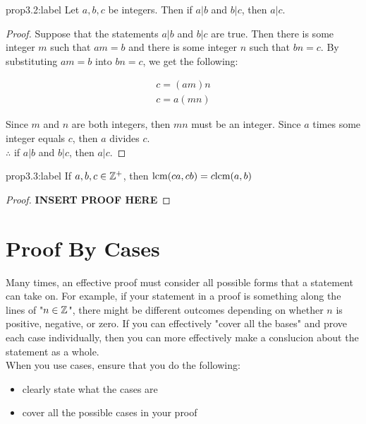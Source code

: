 \begin{proposition}{prop3.2:label}
    Let $a,b,c$ be integers. Then if $a|b$ and $b|c$, then $a|c$. 
\end{proposition}

\begin{proof}
    Suppose that the statements $a|b$ and $b|c$ are true. Then there is some integer $m$ such that $am = b$ and there is some integer $n$ such that $bn = c$. By substituting $am = b$ into $bn = c$, we get the following:

    $$
    \begin{aligned}
        c = (am)n\\
        c = a(mn)
    \end{aligned}
    $$

    Since $m$ and $n$ are both integers, then $mn$ must be an integer. Since $a$ times some integer equals $c$, then $a$ divides $c$.\\

    $\therefore$ if $a|b$ and $b|c$, then $a|c$.
\end{proof}

\begin{proposition}{prop3.3:label}
    If $a,b,c \in \mathbb{Z}^+$, then $\text{lcm}(ca,cb) = c\text{lcm}(a,b)$
\end{proposition}

\begin{proof}
    \textbf{INSERT PROOF HERE}
\end{proof}

\section{Proof By Cases}

Many times, an effective proof must consider all possible forms that a statement can take on. For example, if your statement in a proof is something along the lines of "$n \in \mathbb{Z}$", there might be different outcomes depending on whether $n$ is positive, negative, or zero. If you can effectively "cover all the bases" and prove each case individually, then you can more effectively make a conslucion about the statement as a whole.\\

When you use cases, ensure that you do the following:
\begin{itemize}
    \item clearly state what the cases are
    \item cover all the possible cases in your proof
\end{itemize}

